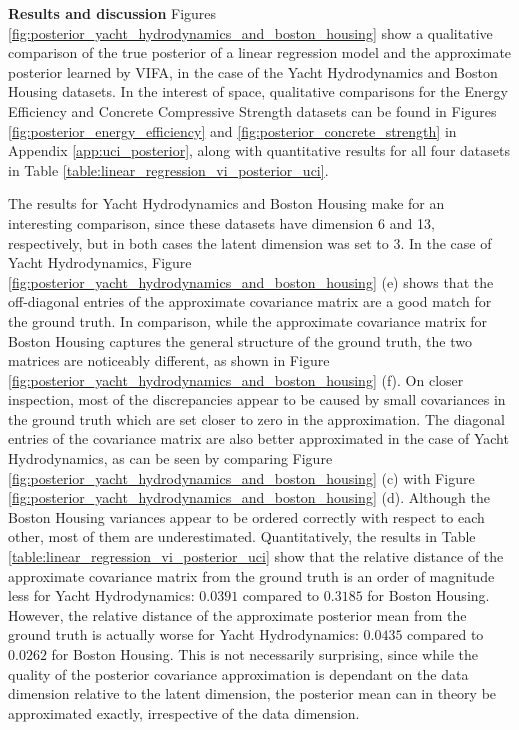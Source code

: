 \documentclass[10pt]{article} %
\begin{document}
\textbf{Results and discussion}
Figures \ref{fig:posterior_yacht_hydrodynamics_and_boston_housing} show a qualitative comparison of the true posterior of a linear regression model and the approximate posterior learned by VIFA, in the case of the Yacht Hydrodynamics and Boston Housing datasets. In the interest of space, qualitative comparisons for the Energy Efficiency and Concrete Compressive Strength datasets can be found in Figures \ref{fig:posterior_energy_efficiency} and \ref{fig:posterior_concrete_strength} in Appendix \ref{app:uci_posterior}, along with quantitative results for all four datasets in Table \ref{table:linear_regression_vi_posterior_uci}.

The results for Yacht Hydrodynamics and Boston Housing make for an interesting comparison, since these datasets have dimension 6 and 13, respectively, but in both cases the latent dimension was set to 3. In the case of Yacht Hydrodynamics, Figure \ref{fig:posterior_yacht_hydrodynamics_and_boston_housing} (e) shows that the off-diagonal entries of the approximate covariance matrix are a good match for the ground truth. In comparison, while the approximate covariance matrix for Boston Housing captures the general structure of the ground truth, the two matrices are noticeably different, as shown in Figure \ref{fig:posterior_yacht_hydrodynamics_and_boston_housing} (f). On closer inspection, most of the discrepancies appear to be caused by small covariances in the ground truth which are set closer to zero in the approximation. The diagonal entries of the covariance matrix are also better approximated in the case of Yacht Hydrodynamics, as can be seen by comparing Figure \ref{fig:posterior_yacht_hydrodynamics_and_boston_housing} (c) with Figure \ref{fig:posterior_yacht_hydrodynamics_and_boston_housing} (d). Although the Boston Housing variances appear to be ordered correctly with respect to each other, most of them are underestimated. Quantitatively, the results in Table \ref{table:linear_regression_vi_posterior_uci} show that the relative distance of the approximate covariance matrix from the ground truth is an order of magnitude less for Yacht Hydrodynamics: $0.0391$ compared to $0.3185$ for Boston Housing. However, the relative distance of the approximate posterior mean from the ground truth is actually worse for Yacht Hydrodynamics: $0.0435$ compared to $0.0262$ for Boston Housing. This is not necessarily surprising, since while the quality of the posterior covariance approximation is dependant on the data dimension relative to the latent dimension, the posterior mean can in theory be approximated exactly, irrespective of the data dimension. 
\end{document}
